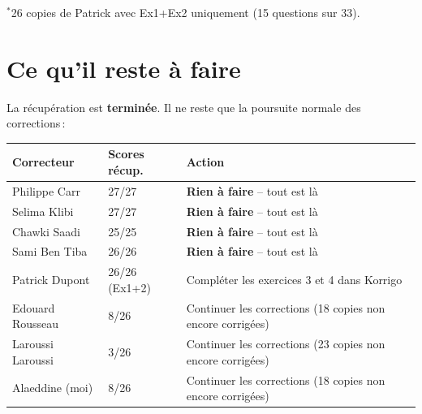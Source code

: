 \documentclass[11pt,a4paper]{article}
\begin{document}
{\small $^*$26 copies de Patrick avec Ex1+Ex2 uniquement (15 questions sur 33).}

\section{Ce qu'il reste \`{a} faire}

La r\'{e}cup\'{e}ration est \textbf{termin\'{e}e}. Il ne reste que la poursuite normale des corrections\,:

\begin{center}
	\renewcommand{\arraystretch}{1.4}
	\begin{tabularx}{\linewidth}{L{3cm}|C{2.4cm}|X|}
		\toprule
		\textbf{\sffamily Correcteur} & \textbf{\sffamily Scores r\'{e}cup.} & \textbf{\sffamily Action}                                        \\
		\midrule
		Philippe Carr                 & 27/27                                & \textcolor{vertOK}{\textbf{Rien \`{a} faire}} -- tout est l\`{a} \\
		\midrule
		Selima Klibi                  & 27/27                                & \textcolor{vertOK}{\textbf{Rien \`{a} faire}} -- tout est l\`{a} \\
		\midrule
		Chawki Saadi                  & 25/25                                & \textcolor{vertOK}{\textbf{Rien \`{a} faire}} -- tout est l\`{a} \\
		\midrule
		Sami Ben Tiba                 & 26/26                                & \textcolor{vertOK}{\textbf{Rien \`{a} faire}} -- tout est l\`{a} \\
		\midrule
		Patrick Dupont                & 26/26 (Ex1+2)                        & Compl\'{e}ter les exercices 3 et 4 dans Korrigo                  \\
		\midrule
		Edouard Rousseau              & 8/26                                 & Continuer les corrections (18 copies non encore corrig\'{e}es)   \\
		\midrule
		Laroussi Laroussi             & 3/26                                 & Continuer les corrections (23 copies non encore corrig\'{e}es)   \\
		\midrule
		Alaeddine (moi)               & 8/26                                 & Continuer les corrections (18 copies non encore corrig\'{e}es)   \\
		\bottomrule
	\end{tabularx}
\end{center}
\end{document}
